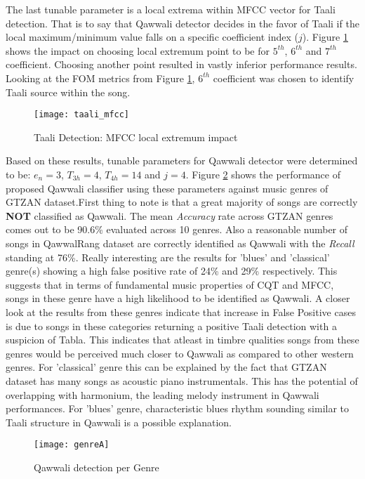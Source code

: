 \documentclass{article}
\begin{document}
The last tunable parameter is a local extrema within MFCC vector for Taali detection. That is to say that Qawwali detector decides in the favor of Taali if the local maximum/minimum value falls on a specific coefficient index ($j$). Figure \ref{fig:src_mfcc} shows the impact on choosing local extremum point to be for $5^{th}$, $6^{th}$ and $7^{th}$ coefficient. Choosing another point resulted in vastly inferior performance results. Looking at the FOM metrics from Figure \ref{fig:src_mfcc}, $6^{th}$ coefficient was chosen to identify Taali source within the song.
\begin{figure}[htbp]
  \centering
  \texttt{[image: taali\_mfcc]}
  \caption{Taali Detection: MFCC local extremum impact}
\label{fig:src_mfcc}
\end{figure}

Based on these results, tunable parameters for Qawwali detector were determined to be: $e_{n}=3$, $T_{3h}=4$, $T_{4h}=14$ and $j=4$. Figure \ref{fig:src_genre} shows the performance of proposed Qawwali classifier using these parameters against music genres of GTZAN dataset.First thing to note is that a great majority of songs are correctly \textbf{NOT} classified as Qawwali. The mean \textit{Accuracy} rate across GTZAN genres comes out to be 90.6\% evaluated across 10 genres. Also a reasonable number of songs in QawwalRang dataset are correctly identified as Qawwali with the \textit{Recall} standing at 76\%. Really interesting are the results for 'blues' and 'classical' genre(s) showing a high false positive rate of 24\% and 29\% respectively. This suggests that in terms of fundamental music properties of CQT and MFCC, songs in these genre have a high likelihood to be identified as Qawwali. A closer look at the results from these genres indicate that increase in False Positive cases is due to songs in these categories returning a positive Taali detection with a suspicion of Tabla. This indicates that atleast in timbre qualities songs from these genres would be perceived much closer to Qawwali as compared to other western genres. For 'classical' genre this can be explained by the fact that GTZAN dataset has many songs as acoustic piano instrumentals. This has the potential of overlapping with harmonium, the leading melody instrument in Qawwali performances. For 'blues' genre, characteristic blues rhythm sounding similar to Taali structure in Qawwali is a possible explanation. 

\begin{figure}[htbp]
  \centering
  \texttt{[image: genreA]}
  \caption{Qawwali detection per Genre}
\label{fig:src_genre}
\end{figure}
\end{document}
